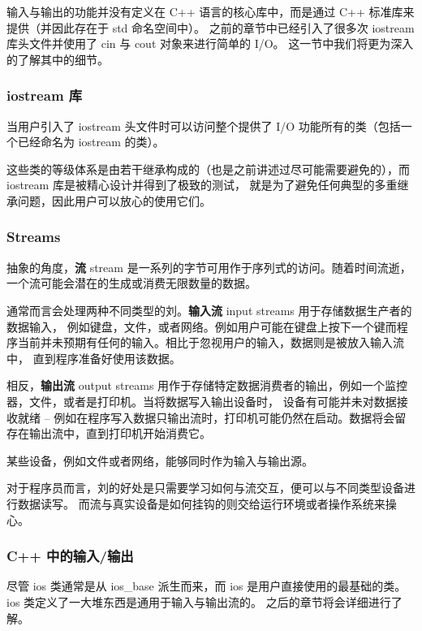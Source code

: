 \documentclass[../../LearnCpp.tex]{subfiles}
\begin{document}

输入与输出的功能并没有定义在 C++ 语言的核心库中，而是通过 C++ 标准库来提供（并因此存在于 std 命名空间中）。
之前的章节中已经引入了很多次 iostream 库头文件并使用了 cin 与 cout 对象来进行简单的 I/O。
这一节中我们将更为深入的了解其中的细节。

\subsubsection*{iostream 库}

当用户引入了 iostream 头文件时可以访问整个提供了 I/O 功能所有的类（包括一个已经命名为 iostream 的类）。

这些类的等级体系是由若干继承构成的（也是之前讲述过尽可能需要避免的），而 iostream 库是被精心设计并得到了极致的测试，
就是为了避免任何典型的多重继承问题，因此用户可以放心的使用它们。

\subsubsection*{Streams}

抽象的角度，\textbf{流} stream 是一系列的字节可用作于序列式的访问。随着时间流逝，一个流可能会潜在的生成或消费无限数量的数据。

通常而言会处理两种不同类型的刘。\textbf{输入流} input streams 用于存储数据生产者的数据输入，
例如键盘，文件，或者网络。例如用户可能在键盘上按下一个键而程序当前并未预期有任何的输入。相比于忽视用户的输入，数据则是被放入输入流中，
直到程序准备好使用该数据。

相反，\textbf{输出流} output streams 用作于存储特定数据消费者的输出，例如一个监控器，文件，或者是打印机。当将数据写入输出设备时，
设备有可能并未对数据接收就绪 -- 例如在程序写入数据只输出流时，打印机可能仍然在启动。数据将会留存在输出流中，直到打印机开始消费它。

某些设备，例如文件或者网络，能够同时作为输入与输出源。

对于程序员而言，刘的好处是只需要学习如何与流交互，便可以与不同类型设备进行数据读写。
而流与真实设备是如何挂钩的则交给运行环境或者操作系统来操心。

\subsubsection*{C++ 中的输入/输出}

尽管 ios 类通常是从 ios\_base 派生而来，而 ios 是用户直接使用的最基础的类。ios 类定义了一大堆东西是通用于输入与输出流的。
之后的章节将会详细进行了解。
\end{document}
